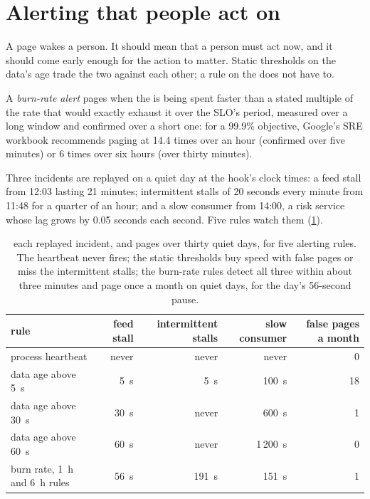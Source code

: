 \section{Alerting that people act on}

A page wakes a person. It should mean that a person must act now, and it should come early enough for the action to matter. Static
thresholds on the data's age trade the two against each other; a rule on the  does not have to.

\begin{definition}\label{def:pl:observability-and-incident-response:burn}
A \emph{burn-rate alert} pages when the  is being spent faster than a stated multiple of the rate that
would exactly exhaust it over the SLO's period, measured over a long window and confirmed over a short one: for a 99.9\% objective, Google's
SRE workbook recommends paging at 14.4 times over an hour (confirmed over five minutes) or 6 times over six hours (over thirty minutes).
\end{definition}

\label{lst:pl:observability-and-incident-response:burn}

Three incidents are replayed on a quiet day at the hook's clock times: a feed stall from 12:03 lasting 21 minutes; intermittent stalls of 20
seconds every minute from 11:48 for a quarter of an hour; and a slow consumer from 14:00, a risk service whose lag grows by 0.05 seconds each
second. Five rules watch them (\cref{tab:pl:observability-and-incident-response:rules}).

\begin{table}[htbp]
\centering\small
\begin{tabular}{lrrrr}
\toprule
rule & feed stall & intermittent stalls & slow consumer & false pages a month\\
\midrule
process heartbeat & never & never & never & 0\\
data age above 5~s & 5~s & 5~s & 100~s & 18\\
data age above 30~s & 30~s & never & 600~s & 1\\
data age above 60~s & 60~s & never & 1\,200~s & 0\\
burn rate, 1~h and 6~h rules & 56~s & 191~s & 151~s & 1\\
\bottomrule
\end{tabular}
\caption{ each replayed incident, and pages over thirty quiet days, for five alerting rules. The heartbeat never fires; the
static thresholds buy speed with false pages or miss the intermittent stalls; the burn-rate rules detect all three within about three minutes
and page once a month on quiet days, for the day's 56-second pause.}
\label{tab:pl:observability-and-incident-response:rules}
\end{table}

